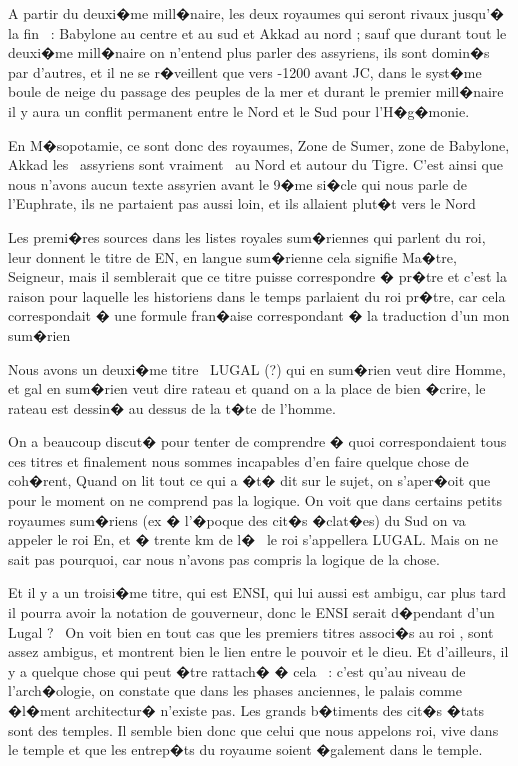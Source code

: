 \documentclass{article}
\begin{document}
A partir du deuxi�me mill�naire, les deux royaumes qui seront rivaux jusqu'� la fin \ : Babylone au centre et au sud et Akkad au nord ; sauf que durant tout le deuxi�me mill�naire on n'entend plus parler des assyriens, ils sont domin�s par d'autres, et il ne se r�veillent que vers -1200 avant JC, dans le syst�me boule de neige du passage des peuples de la mer et durant le premier mill�naire il y aura un conflit permanent entre le Nord et le Sud pour l'H�g�monie.


\bigskip


\bigskip

En M�sopotamie, ce sont donc des royaumes, Zone de Sumer, zone de Babylone, Akkad les \ assyriens sont vraiment \ au Nord et autour du Tigre. C'est ainsi que nous n'avons aucun texte assyrien avant le 9�me si�cle qui nous parle de l'Euphrate, ils ne partaient pas aussi loin, et ils allaient plut�t vers le Nord


\bigskip


\bigskip


\bigskip

Les premi�res sources dans les listes royales sum�riennes qui parlent du roi, leur donnent le titre de EN, en langue sum�rienne cela signifie Ma�tre, Seigneur, mais il semblerait que ce titre puisse correspondre � pr�tre et c'est la raison pour laquelle les historiens dans le temps parlaient du roi pr�tre, car cela correspondait � une formule fran�aise correspondant � la traduction d'un mon sum�rien 

Nous avons un deuxi�me titre \ LUGAL (?) qui en sum�rien veut dire Homme, et gal en sum�rien veut dire rateau et quand on a la place de bien �crire, le rateau est dessin� au dessus de la t�te de l'homme.


\bigskip

On a beaucoup discut� pour tenter de comprendre � quoi correspondaient tous ces titres et finalement nous sommes incapables d'en faire quelque chose de coh�rent, Quand on lit tout ce qui a �t� dit sur le sujet, on s'aper�oit que pour le moment on ne comprend pas la logique. On voit que dans certains petits royaumes sum�riens (ex � l'�poque des cit�s �clat�es) du Sud on va appeler le roi En, et � trente km de l� \ le roi s'appellera LUGAL. Mais on ne sait pas pourquoi, car nous n'avons pas compris la logique de la chose.


\bigskip

Et il y a un troisi�me titre, qui est ENSI, qui lui aussi est ambigu, car plus tard il pourra avoir la notation de gouverneur, donc le ENSI serait d�pendant d'un Lugal ? \ On voit bien en tout cas que les premiers titres associ�s au roi , sont assez ambigus, et montrent bien le lien entre le pouvoir et le dieu. Et d'ailleurs, il y a quelque chose qui peut �tre rattach� � cela \ : c'est qu'au niveau de l'arch�ologie, on constate que dans les phases anciennes, le palais comme �l�ment architectur� n'existe pas. Les grands b�timents des cit�s �tats sont des temples. Il semble bien donc que celui que nous appelons roi, vive dans le temple et que les entrep�ts du royaume soient �galement dans le temple.
\end{document}

